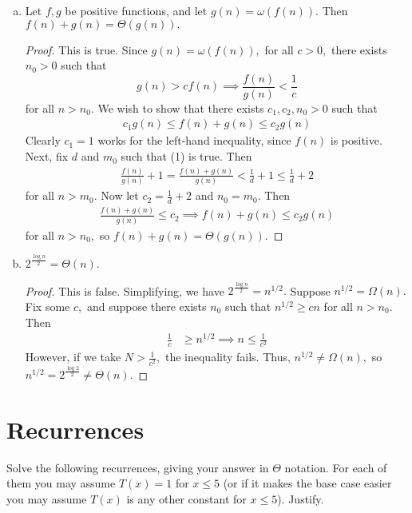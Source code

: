 \documentclass{article}
\begin{document}
\begin{enumerate}[(a)]
	\item Let $f, g$ be positive functions, and let $g(n)=\omega(f(n)).$ Then $f(n)+g(n)=\Theta(g(n)).$
		\begin{proof}
			This is true. Since $g(n)=\omega(f(n)),$ for all $c>0,$ there exists $n_0>0$ such that 
			\begin{equation}
				g(n) > cf(n)\implies \frac{f(n)}{g(n)}<\frac{1}{c}
			\end{equation}
			for all $n>n_0.$ We wish to show that there exists $c_1, c_2, n_0>0$ such that 
			\begin{align*}
				c_1g(n) \le f(n)+g(n)\le c_2g(n)
			\end{align*}
			Clearly $c_1=1$ works for the left-hand inequality, since $f(n)$ is positive. Next, fix $d$ and $m_0$ such that (1) is true. Then 
			\begin{align*}
				\frac{f(n)}{g(n)}+1 = \frac{f(n)+g(n)}{g(n)} <\frac{1}{d} + 1 \le \frac{1}{d} + 2
			\end{align*}
			for all $n>m_0.$ Now let $c_2=\frac{1}{d} + 2$ and $n_0=m_0.$ Then
			\begin{align*}
				\frac{f(n)+g(n)}{g(n)}\le c_2\implies f(n)+g(n)\le c_2g(n)
			\end{align*}
			for all $n>n_0,$ so $f(n)+g(n)=\Theta(g(n)).$	
		\end{proof}

	\item $2^{\frac{\log n}{2}} = \Theta(n).$
		\begin{proof}
			This is false. Simplifying, we have $2^{\frac{\log n}{2}} = n^{1/2}.$ Suppose $n^{1/2}=\Omega(n).$ Fix some $c,$ and suppose there exists $n_0$ such that $n^{1/2}\ge cn$ for all $n>n_0.$ Then
			\begin{align*}
				\frac{1}{c} &\ge n^{1/2}\implies n\le \frac{1}{c^2}
			\end{align*}
			However, if we take $N>\frac{1}{c^2},$ the inequality fails. Thus, $n^{1/2}\neq \Omega(n),$ so $n^{1/2} = 2^{\frac{\log 2}{2}} \neq \Theta(n).$
		\end{proof}

\end{enumerate}

\section{Recurrences}

Solve the following recurrences, giving your answer in $\Theta$ notation. For each of them you may assume $T(x)=1$ for $x\le 5$ (or if it makes the base case easier you may assume $T(x)$ is any other constant for $x\le 5$). Justify.
\end{document}
